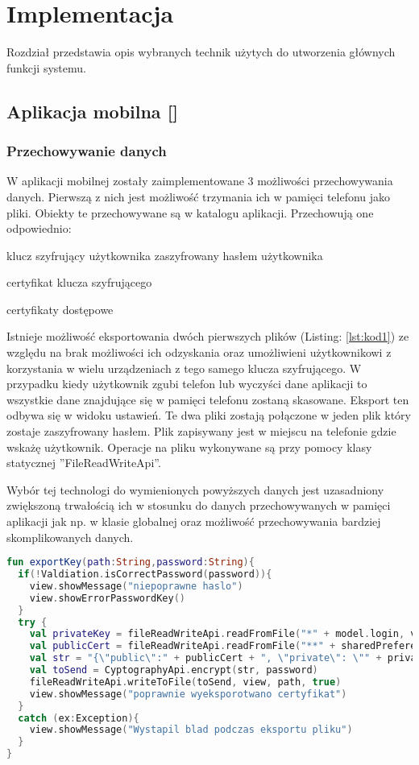 \newpage\section{Implementacja} \label{sec:implementacja}
Rozdział przedstawia opis wybranych technik użytych do utworzenia głównych funkcji systemu. 
\subsection[Aplikacja mobilna]{Aplikacja mobilna [\StudentB]}
	\subsubsection{Przechowywanie danych}
	W aplikacji mobilnej zostały zaimplementowane 3 możliwości przechowywania danych. Pierwszą z nich jest możliwość trzymania ich w pamięci telefonu jako pliki. Obiekty te przechowywane są w katalogu aplikacji. Przechowują one odpowiednio:
	\begin{itemize*}
	\item	klucz szyfrujący użytkownika zaszyfrowany hasłem użytkownika
	\item certyfikat klucza szyfrującego 
	\item certyfikaty dostępowe
	\end{itemize*}	
	Istnieje możliwość eksportowania dwóch pierwszych plików (Listing: \ref{lst:kod1}) ze względu na brak możliwości ich odzyskania oraz umożliwieni użytkownikowi z korzystania w wielu urządzeniach z tego samego klucza szyfrującego. W przypadku kiedy użytkownik zgubi telefon lub  wyczyści dane aplikacji to wszystkie dane znajdujące się w pamięci telefonu zostaną skasowane. Eksport ten odbywa się w widoku ustawień. Te dwa pliki zostają połączone w jeden plik który zostaje zaszyfrowany hasłem. Plik zapisywany jest w miejscu na telefonie gdzie wskażę użytkownik.  Operacje na pliku wykonywane są przy pomocy klasy statycznej ''FileReadWriteApi''.
	
	Wybór  tej technologi do wymienionych powyższych danych jest uzasadniony zwiększoną trwałością ich w stosunku do danych przechowywanych w pamięci aplikacji jak np.  w klasie globalnej oraz możliwość przechowywania bardziej skomplikowanych danych.
	
	\begin{lstlisting}[caption={Funkcja eksportująca klucz szyfrujący.}, label={lst:kod1}, language=Kotlin]
fun exportKey(path:String,password:String){
  if(!Valdiation.isCorrectPassword(password)){
    view.showMessage("niepoprawne haslo")
    view.showErrorPasswordKey()
  }
  try {
    val privateKey = fileReadWriteApi.readFromFile("*" + model.login, view)
    val publicCert = fileReadWriteApi.readFromFile("**" + sharedPreferenceApi.getString(view, EnumChoice.login), view)	
    val str = "{\"public\":" + publicCert + ", \"private\": \"" + privateKey + "\"}"
    val toSend = CyptographyApi.encrypt(str, password)
    fileReadWriteApi.writeToFile(toSend, view, path, true)
    view.showMessage("poprawnie wyeksporotwano certyfikat")
  }
  catch (ex:Exception){
    view.showMessage("Wystapil blad podczas eksportu pliku")
  }
}
	\end{lstlisting}	
		
